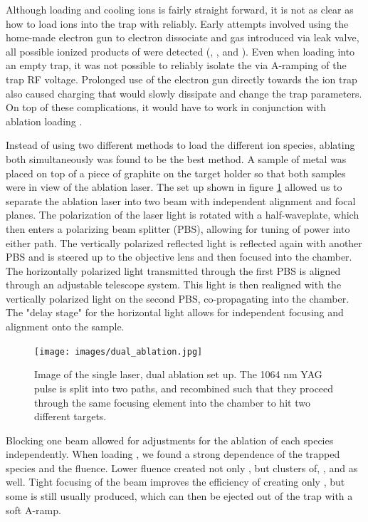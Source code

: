 Although loading and cooling  ions is fairly straight forward, it is not as clear as how to load  ions into the trap with  reliably. Early attempts involved using the home-made electron gun to electron dissociate and  gas introduced via leak valve, all possible ionized products of  were detected (, , and ). Even when loading into an empty trap, it was not possible to reliably isolate the  via A-ramping of the trap RF voltage. Prolonged use of the electron gun directly towards the ion trap also caused charging that would slowly dissipate and change the trap parameters. On top of these complications, it would have to work in conjunction with ablation loading .

Instead of using two different methods to load the different ion species, ablating both simultaneously was found to be the best method. A sample of  metal was placed on top of a piece of graphite on the target holder so that both samples were in view of the ablation laser. The set up shown in figure \ref{fig: dual ablation} allowed us to separate the ablation laser into two beam with independent alignment and focal planes. The polarization of the laser light is rotated with a half-waveplate, which then enters a polarizing beam splitter (PBS), allowing for tuning of power into either path. The vertically polarized reflected light is reflected again with another PBS and is steered up to the objective lens and then focused into the chamber. The horizontally polarized light transmitted through the first PBS is aligned through an adjustable telescope system. This light is then realigned with the vertically polarized light on the second PBS, co-propagating into the chamber. The "delay stage" for the horizontal light allows for independent focusing and alignment onto the sample.

\begin{figure}[H]
	\centering
	\texttt{[image: images/dual\_ablation.jpg]}
	\caption{Image of the single laser, dual ablation set up. The 1064 nm YAG pulse is split into two paths, and recombined such that they proceed through the same focusing element into the chamber to hit two different targets.}
	\label{fig: dual ablation}
\end{figure}

Blocking one beam allowed for adjustments for the ablation of each species independently. When loading , we found a strong dependence of the trapped species and the fluence. Lower fluence created not only , but clusters of, , and  as well. Tight focusing of the beam improves the efficiency of creating only , but some  is still usually produced, which can then be ejected out of the trap with a soft A-ramp.

